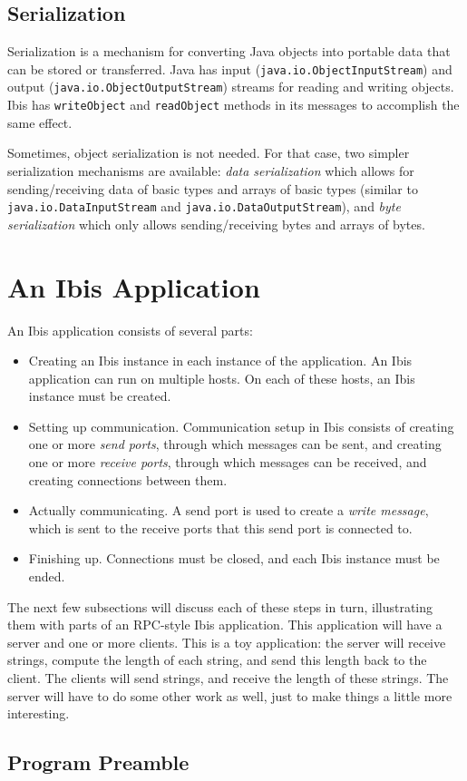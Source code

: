 \documentclass[10pt]{article}
\newcommand{\mysection}[1]{\section{#1}\label{#1}}
\newcommand{\mysubsection}[1]{\subsection{#1}\label{#1}}
\begin{document}
\mysubsection{Serialization}

Serialization is a mechanism for converting Java objects
into portable data that can be stored or transferred.
Java has input
(\texttt{java.io.ObjectInputStream})
and output
(\texttt{java.io.ObjectOutputStream})
streams for reading and writing
objects.
Ibis has \texttt{writeObject} and \texttt{readObject} methods in
its messages to accomplish the same effect. 

Sometimes, object serialization is not needed. For that case,
two simpler serialization mechanisms are available: \emph{data
serialization} which allows for sending/receiving data of basic types
and arrays of basic types (similar to \texttt{java.io.DataInputStream}
and \texttt{java.io.DataOutputStream}), and \emph{byte serialization}
which only allows sending/receiving bytes and arrays of bytes.

\mysection{An Ibis Application}

An Ibis application consists of several parts:
\begin{itemize}
\item
Creating an Ibis instance in each instance of the application.
An Ibis application can run on multiple hosts.
On each of these hosts, an Ibis instance must be created.
\item
Setting up communication. Communication setup in Ibis
consists of creating one or more \emph{send ports}, through which messages
can be sent, and creating one or more \emph{receive ports},
through which messages can be received, and creating connections between them.
\item
Actually communicating. A send port is used to create a 
\emph{write message}, which is sent to the receive ports that this send port
is connected to.
\item
Finishing up. Connections must be closed, and each Ibis instance must
be ended.
\end{itemize}
\noindent
The next few subsections will discuss each of these steps in turn,
illustrating them with parts of an RPC-style Ibis application.
This application will have a server and one or more clients. This is a toy
application: the server will receive strings, compute the length of each string,
and send this length back to the client.
The clients will send strings, and receive the length of these strings.
The server will have to do some other work as well, just to make
things a little more interesting.

\subsection{Program Preamble}
\end{document}
